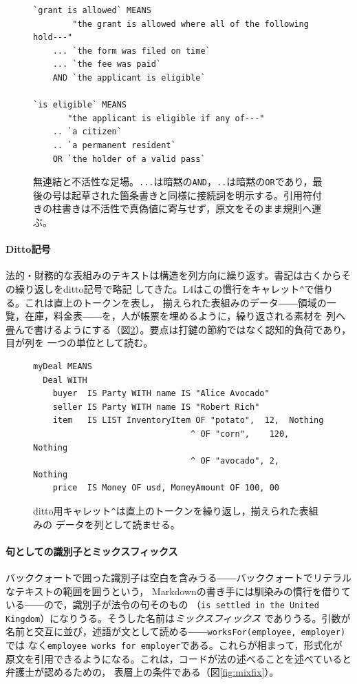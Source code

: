 \documentclass[11pt,a4paper]{ltjsarticle}
\newcommand{\bq}{\char96\relax}
\newcommand{\code}[1]{\texttt{\small #1}}
\begin{document}
\begin{figure}[t]
\begin{lstlisting}
`grant is allowed` MEANS
        "the grant is allowed where all of the following hold---"
    ... `the form was filed on time`
    ... `the fee was paid`
    AND `the applicant is eligible`

`is eligible` MEANS
       "the applicant is eligible if any of---"
    .. `a citizen`
    .. `a permanent resident`
    OR `the holder of a valid pass`
\end{lstlisting}
\caption{無連結と不活性な足場。\code{...}は暗黙の\code{AND}，\code{..}は暗黙の\code{OR}であり，最後の号は起草された箇条書きと同様に接続詞を明示する。引用符付きの柱書きは不活性で真偽値に寄与せず，原文をそのまま規則へ運ぶ。}
\label{fig:asyndeton}
\end{figure}

\paragraph{Ditto記号}
法的・財務的な表組みのテキストは構造を列方向に繰り返す。書記は古くからその繰り返しをditto記号で略記
してきた。L4はこの慣行をキャレット\code{\textasciicircum}で借りる。これは直上のトークンを表し，
揃えられた表組みのデータ――領域の一覧，在庫，料金表――を，人が帳票を埋めるように，繰り返される素材を
列へ畳んで書けるようにする（図\ref{fig:ditto}）。要点は打鍵の節約ではなく認知的負荷であり，目が列を
一つの単位として読む。

\begin{figure}[t]
\begin{lstlisting}
myDeal MEANS
  Deal WITH
    buyer  IS Party WITH name IS "Alice Avocado"
    seller IS Party WITH name IS "Robert Rich"
    item   IS LIST InventoryItem OF "potato",  12,  Nothing
                                ^ OF "corn",    120, Nothing
                                ^ OF "avocado", 2,   Nothing
    price  IS Money OF usd, MoneyAmount OF 100, 00
\end{lstlisting}
\caption{ditto用キャレット\code{\textasciicircum}は直上のトークンを繰り返し，揃えられた表組みの
データを列として読ませる。}
\label{fig:ditto}
\end{figure}

\paragraph{句としての識別子とミックスフィックス}
バッククォートで囲った識別子は空白を含みうる――バッククォートでリテラルなテキストの範囲を囲うという，
Markdownの書き手には馴染みの慣行を借りている――ので，識別子が法令の句そのもの
（\code{\bq is settled in the United Kingdom\bq}）になりうる。そうした名前は\emph{ミックスフィックス}
でありうる。引数が名前と交互に並び，述語が文として読める――\code{worksFor(employee, employer)}では
なく\code{\bq employee\bq{} \bq works for\bq{} \bq employer\bq}である。これらが相まって，形式化が
原文を引用できるようになる。これは，コードが法の述べることを述べていると弁護士が認めるための，
表層上の条件である（図\ref{fig:mixfix}）。
\end{document}
